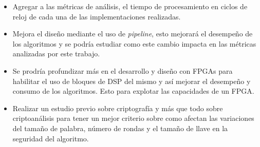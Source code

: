 \begin{itemize}
\item Agregar a las métricas de análisis, el tiempo de procesamiento en ciclos de reloj de cada una de las implementaciones realizadas.
\item Mejora el diseño mediante el uso de \textit{pipeline}, esto mejorará el desempeño de los algoritmos y se podría estudiar como este cambio impacta en las métricas analizadas por este trabajo.
\item Se prodría profundizar más en el desarrollo y diseño con FPGAs para habilitar el uso de bloques de DSP del mismo y así mejorar el desempeño y consumo de los algoritmos. Esto para explotar las capacidades de un FPGA.
\item Realizar un estudio previo sobre criptografía y más que todo sobre criptoanálisis para tener un mejor criterio sobre como afectan las variaciones del tamaño de palabra, número de rondas y el tamaño de llave en la seguridad del algoritmo.
\end{itemize}
